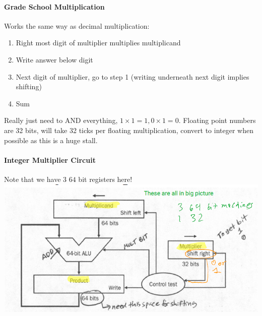 \documentclass[12 pt]{article}
\begin{document}
\paragraph{Grade School Multiplication}
Works the same way as decimal multiplication:
\begin{enumerate}
\item Right most digit of multiplier multiplies multiplicand
\item Write answer below digit
\item Next digit of multiplier, go to step 1 (writing underneath next digit implies shifting)
\item Sum
\end{enumerate}
Really just need to AND everything, $1\times 1=1, 0\times 1=0$. Floating point numbers are 32 bits, will take 32 ticks per floating multiplication, convert to integer when possible as this is a huge stall.
\paragraph{Integer Multiplier Circuit} Note that we have 3 $64$ bit registers here!\\
\includegraphics[scale=0.7]{imc}
\end{document}
